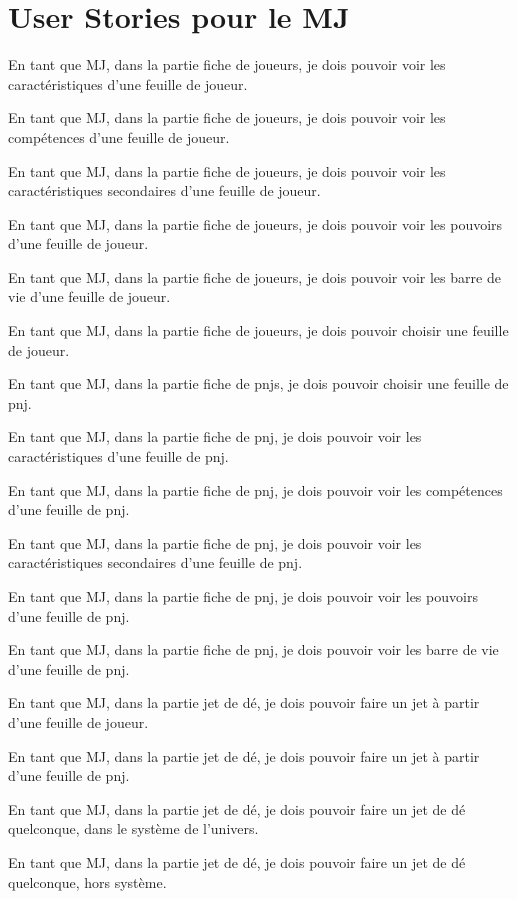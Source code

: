 \chapter{User Stories pour le MJ}

En tant que MJ, dans la partie fiche de joueurs, je dois pouvoir voir les
caractéristiques d'une feuille de joueur.
~

En tant que MJ, dans la partie fiche de joueurs, je dois pouvoir voir les
compétences d'une feuille de joueur.
~

En tant que MJ, dans la partie fiche de joueurs, je dois pouvoir voir les
caractéristiques secondaires d'une feuille de joueur.
~

En tant que MJ, dans la partie fiche de joueurs, je dois pouvoir voir les
pouvoirs d'une feuille de joueur.
~

En tant que MJ, dans la partie fiche de joueurs, je dois pouvoir voir les
barre de vie d'une feuille de joueur.
~

En tant que MJ, dans la partie fiche de joueurs, je dois pouvoir choisir une
feuille de joueur.
~

En tant que MJ, dans la partie fiche de pnjs, je dois pouvoir choisir une
feuille de pnj. ~

En tant que MJ, dans la partie fiche de pnj, je dois pouvoir voir les
caractéristiques d'une feuille de pnj.
~

En tant que MJ, dans la partie fiche de pnj, je dois pouvoir voir les
compétences d'une feuille de pnj.
~

En tant que MJ, dans la partie fiche de pnj, je dois pouvoir voir les
caractéristiques secondaires d'une feuille de pnj.
~

En tant que MJ, dans la partie fiche de pnj, je dois pouvoir voir les
pouvoirs d'une feuille de pnj.
~

En tant que MJ, dans la partie fiche de pnj, je dois pouvoir voir les
barre de vie d'une feuille de pnj.
~

En tant que MJ, dans la partie jet de dé, je dois pouvoir faire un jet à partir
d'une feuille de joueur.
~

En tant que MJ, dans la partie jet de dé, je dois pouvoir faire un jet à partir
d'une feuille de pnj.
~

En tant que MJ, dans la partie jet de dé, je dois pouvoir faire un jet de dé
quelconque, dans le système de l'univers.
~

En tant que MJ, dans la partie jet de dé, je dois pouvoir faire un jet de dé
quelconque, hors système.
~



\clearpage
